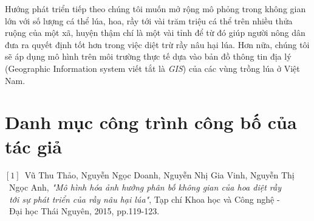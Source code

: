 \documentclass[13pt]{extreport}
\begin{document}
{Hướng phát triển tiếp theo chúng tôi muốn mở rộng mô phỏng trong không gian lớn với số lượng cá thể lúa, hoa, rầy tới vài trăm triệu cá thể trên nhiều thửa ruộng của một xã, huyện thậm chí là một vài tỉnh để từ đó giúp người nông dân đưa ra quyết định tốt hơn trong việc diệt trừ rầy nâu hại lúa. Hơn nữa, chúng tôi sẽ áp dụng mô hình trên môi trường thực tế dựa vào bản đồ thông tin địa lý (Geographic Information system viết tắt là \textit{GIS}) của các vùng trồng lúa ở Việt Nam.\\
\newpage
{}
\chapter*{Danh mục công trình công bố của tác giả}
\begin{flushleft}
\quad $[1]$\ Vũ Thu Thảo, Nguyễn Ngọc Doanh, Nguyễn Nhị Gia Vinh, Nguyễn Thị\\\quad \quad \   Ngọc
Anh, \textit{"Mô hình hóa ảnh hưởng phân bố không gian của hoa diệt rầy\\ \quad \quad \  tới
sự phát triển của rầy nâu hại lúa"}, Tạp chí Khoa học và Công nghệ -\\\quad \quad \  Đại học Thái Nguyên, 2015, pp.119-123.\\
\end{flushleft}
\newpage
{}

\thispagestyle{empty}


}
\end{document}
